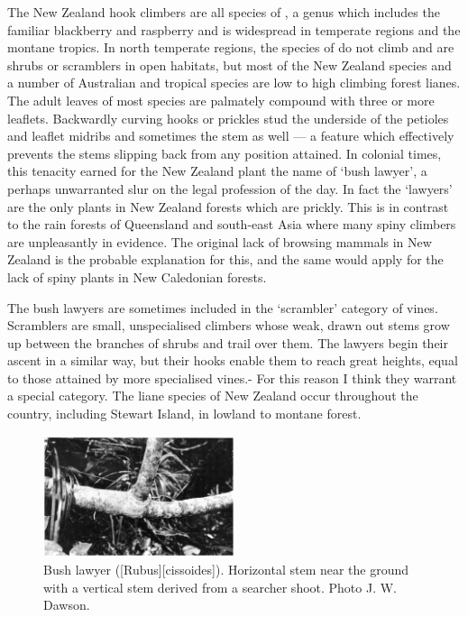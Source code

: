 The New Zealand hook climbers are all species of , a genus which includes the familiar blackberry and raspberry and is widespread in temperate regions and the montane tropics.
In north temperate regions, the species of  do not climb and are shrubs or scramblers in open habitats, but most of the New Zealand species and a number of Australian and tropical species are low to high climbing forest lianes.
The adult leaves of most species are palmately compound with three or more leaflets.
Backwardly curving hooks or prickles stud the underside of the petioles and leaflet midribs and sometimes the stem as well --- a feature which effectively prevents the stems slipping back from any position attained.
In colonial times, this tenacity earned for the New Zealand plant the name of `bush lawyer', a perhaps unwarranted slur on the legal profession of the day.
In fact the `lawyers' are the only plants in New Zealand forests which are prickly.
This is in contrast to the rain forests of Queensland and south-east Asia where many spiny climbers are unpleasantly in evidence.
The original lack of browsing mammals in New Zealand is the probable explanation for this, and the same would apply for the lack of spiny plants in New Caledonian forests.

The bush lawyers are sometimes included in the `scrambler' category of vines.
Scramblers are small, unspecialised climbers whose weak, drawn out stems grow up between the branches of shrubs and trail over them.
The lawyers begin their ascent in a similar way, but their hooks enable them to reach great heights, equal to those attained by more specialised vines.- For this reason I think they warrant a special category.
The liane species of New Zealand  occur throughout the country, including Stewart Island, in lowland to montane forest.

\begin{figure}
	\includegraphics[width=0.5\textwidth]{graphics/figure36bushlawyer.jpg}
	\centering
	\caption[Bush lawyer]{Bush lawyer ([Rubus][cissoides]).
	Horizontal stem near the ground with a vertical stem derived from a searcher shoot.
	Photo  J. W. Dawson.}%
	\label{fig:36bushlawyer}
\end{figure}

